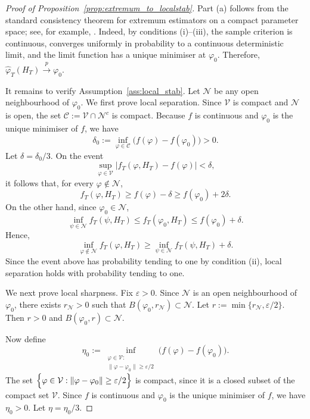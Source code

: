 \documentclass[12pt]{article}
\numberwithin{equation}{section}
\begin{document}
\begin{proof}[Proof of Proposition~\ref{prop:extremum_to_localstab}]

Part (a) follows from the standard consistency theorem for extremum estimators on a compact parameter space; see, for example, \citet{vdV1998}.
Indeed, by conditions (i)--(iii), the sample criterion is continuous, converges uniformly in probability to a continuous deterministic limit, and the limit function has a unique minimiser at $\varphi_0$. Therefore,
$\hat{\varphi}_T(H_T)\overset{p}{\longrightarrow}\varphi_0$.

It remains to verify Assumption~\ref{ass:local_stab}. Let $\mathcal N$ be any open neighbourhood of $\varphi_0$.
We first prove local separation. Since $\mathcal V$ is compact and $\mathcal N$ is open, the set
$\mathcal C:=\mathcal V\cap \mathcal N^c$
is compact. Because $f$ is continuous and $\varphi_0$ is the unique minimiser of $f$, we have
\begin{equation}
\delta_0
:=
\inf_{\varphi\in\mathcal C}
\bigl(f(\varphi)-f(\varphi_0)\bigr)
>0.
\end{equation}
Let $\delta=\delta_0/3$. On the event
\begin{equation}
\sup_{\varphi\in\mathcal V}
|f_T(\varphi,H_T)-f(\varphi)|
<
\delta,
\end{equation}
it follows that, for every $\varphi\notin\mathcal N$,
\begin{equation}
f_T(\varphi,H_T)
\ge
f(\varphi)-\delta
\ge
f(\varphi_0)+2\delta.
\end{equation}
On the other hand, since $\varphi_0\in\mathcal N$,
\begin{equation}
\inf_{\psi\in\mathcal N} f_T(\psi,H_T)
\le
f_T(\varphi_0,H_T)
\le
f(\varphi_0)+\delta.
\end{equation}
Hence,
\begin{equation}
\inf_{\varphi\notin\mathcal N} f_T(\varphi,H_T)
\ge
\inf_{\psi\in\mathcal N} f_T(\psi,H_T)+\delta.
\end{equation}
Since the event above has probability tending to one by condition (ii), local separation holds with probability tending to one.

We next prove local sharpness. Fix $\varepsilon>0$. Since $\mathcal N$ is an open neighbourhood of $\varphi_0$, there exists $r_\mathcal N>0$ such that
$B(\varphi_0,r_\mathcal N)\subset\mathcal N$.
Let
$r:=\min\{r_\mathcal N,\varepsilon/2\}$.
Then $r>0$ and
$B(\varphi_0,r)\subset\mathcal N$.

Now define
\begin{equation}
\eta_0
:=
\inf_{\substack{\varphi\in\mathcal V:\\
\|\varphi-\varphi_0\|\ge \varepsilon/2}}
\bigl(f(\varphi)-f(\varphi_0)\bigr).
\end{equation}
The set
$\Bigl\{\varphi\in\mathcal V:\|\varphi-\varphi_0\|\ge \varepsilon/2\Bigr\}$
is compact, since it is a closed subset of the compact set $\mathcal V$. Since $f$ is continuous and $\varphi_0$ is the unique minimiser of $f$, we have
$\eta_0>0$.
Let $\eta=\eta_0/3$.


\end{proof}
\end{document}
